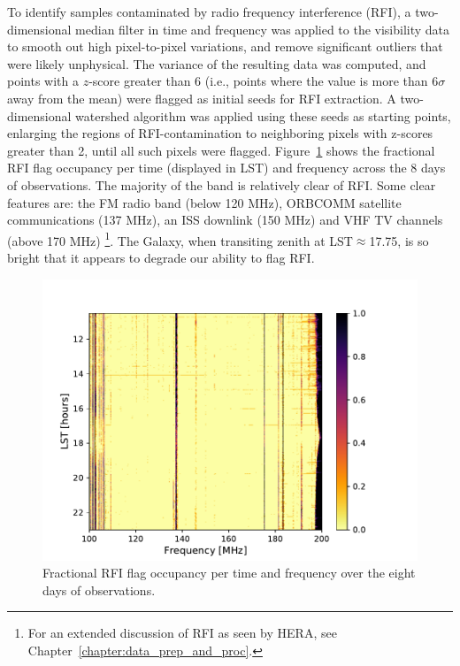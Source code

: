To identify samples contaminated by radio frequency interference (RFI), a two-dimensional median filter in time and frequency was applied to the visibility data to smooth out high pixel-to-pixel variations, and remove significant outliers that were likely unphysical. The variance of the resulting data was computed, and points with a $z$-score greater than 6 (i.e., points where the value is more than 6$\sigma$ away from the mean) were flagged as initial seeds for RFI extraction. A two-dimensional watershed algorithm was applied using these seeds as starting points, enlarging the regions of RFI-contamination to neighboring pixels with z-scores greater than 2, until all such pixels were flagged. Figure~\ref{fig:hera19_rfi} shows the fractional RFI flag occupancy per time (displayed in LST) and frequency across the 8 days of observations. The majority of the band is relatively clear of RFI. Some clear features are: the FM radio band (below 120 MHz), ORBCOMM satellite communications (137 MHz), an ISS downlink (150 MHz) and VHF TV channels (above 170 MHz)
\footnote{For an extended discussion of RFI as seen by HERA, see Chapter~\ref{chapter:data_prep_and_proc}.}. 
The Galaxy, when transiting zenith at LST$\approx$17.75, is so bright that it appears to degrade our ability to flag RFI.

\begin{figure}
\centering
\includegraphics[scale=0.6]{chapters/eor_window_HERA/figures/frac_occ.pdf}
\caption{Fractional RFI flag occupancy per time and frequency over the eight days of observations.}
\label{fig:hera19_rfi}
\end{figure}

